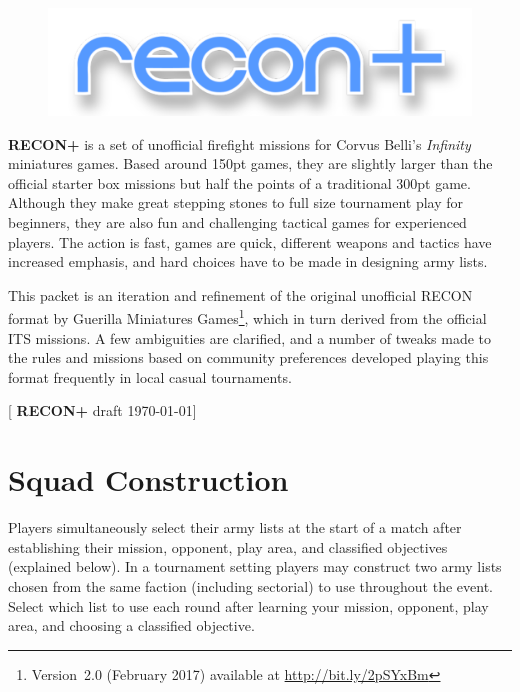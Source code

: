 \documentclass[14pt,dvipsnames]{extarticle}
\newcommand{\reconplus}{\textbf{RECON+}\xspace}
\newcommand\BackgroundPic[1]{%
\put(0,0){%
\parbox[b][\paperheight]{\paperwidth}{%
\vfill%
\centering%
\texttt{[image: \#1]}%
\vfill%
}}}
\newcommand{\setbackground}{%
\AddToShipoutPicture{\BackgroundPic{art/background/background.pdf}}%
}
\begin{document}
\thispagestyle{empty}


\clearpage

\setcounter{page}{1}

\begin{figure}[t!]
  \centering
  \includegraphics{art/cover/title.pdf}  
\end{figure}

  
\noindent\reconplus is a set of unofficial firefight missions for Corvus Belli's
\emph{Infinity} miniatures games.  Based around 150pt games, they are
slightly larger than the official starter box missions but half the
points of a traditional 300pt game.  Although they make great stepping
stones to full size tournament play for beginners, they are also fun
and challenging tactical games for experienced players. The action is
fast, games are quick, different weapons and tactics have increased
emphasis, and hard choices have to be made in designing army lists.

This packet is an iteration and refinement of the original unofficial
RECON format by Guerilla Miniatures Games\footnote{Version~2.0
  (February 2017) available at \url{http://bit.ly/2pSYxBm}}, which in
turn derived from the official ITS missions.  A few ambiguities are
clarified, and a number of tweaks made to the rules and missions based
on community preferences developed playing this format frequently in
local casual tournaments.

\tableofcontents

\vfill

\hfill{\small[ \reconplus draft \today ]}

\clearpage
{}

\section{Squad Construction}

Players simultaneously select their army lists at the start of a match
after establishing their mission, opponent, play area, and classified
objectives (explained below).  In a tournament setting players may
construct two army lists chosen from the same faction (including
sectorial) to use throughout the event.  Select which list to use each
round after learning your mission, opponent, play area, and choosing a
classified objective.
\end{document}
